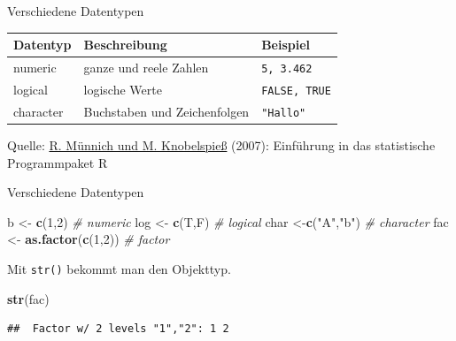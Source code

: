 \documentclass[ignorenonframetext,]{beamer}
\newenvironment{Shaded}{}{}
\newcommand{\KeywordTok}[1]{\textcolor[rgb]{0.00,0.44,0.13}{\textbf{{#1}}}}
\newcommand{\DecValTok}[1]{\textcolor[rgb]{0.25,0.63,0.44}{{#1}}}
\newcommand{\StringTok}[1]{\textcolor[rgb]{0.25,0.44,0.63}{{#1}}}
\newcommand{\CommentTok}[1]{\textcolor[rgb]{0.38,0.63,0.69}{\textit{{#1}}}}
\newcommand{\NormalTok}[1]{{#1}}
\begin{document}
\begin{frame}[fragile]{Verschiedene Datentypen}

\begin{longtable}[]{@{}lll@{}}
\toprule
Datentyp & Beschreibung & Beispiel\tabularnewline
\midrule
\endhead
numeric & ganze und reele Zahlen & \texttt{5,\ 3.462}\tabularnewline
logical & logische Werte & \texttt{FALSE,\ TRUE}\tabularnewline
character & Buchstaben und Zeichenfolgen &
\texttt{"Hallo"}\tabularnewline
\bottomrule
\end{longtable}

Quelle:
\href{https://www.uni-trier.de/fileadmin/fb4/prof/VWL/FIN/Oekonometrie/PC-UEbung/Einfuehrung_in_R.pdf}{R.
Münnich und M. Knobelspieß} (2007): Einführung in das statistische
Programmpaket R

\end{frame}

\begin{frame}[fragile]{Verschiedene Datentypen}

\begin{Shaded}
\begin{Highlighting}[]
\NormalTok{b <-}\StringTok{ }\KeywordTok{c}\NormalTok{(}\DecValTok{1}\NormalTok{,}\DecValTok{2}\NormalTok{) }\CommentTok{# numeric}
\NormalTok{log <-}\StringTok{ }\KeywordTok{c}\NormalTok{(T,F) }\CommentTok{# logical}
\NormalTok{char <-}\KeywordTok{c}\NormalTok{(}\StringTok{"A"}\NormalTok{,}\StringTok{"b"}\NormalTok{) }\CommentTok{# character}
\NormalTok{fac <-}\StringTok{ }\KeywordTok{as.factor}\NormalTok{(}\KeywordTok{c}\NormalTok{(}\DecValTok{1}\NormalTok{,}\DecValTok{2}\NormalTok{)) }\CommentTok{# factor}
\end{Highlighting}
\end{Shaded}

Mit \texttt{str()} bekommt man den Objekttyp.

\begin{Shaded}
\begin{Highlighting}[]
\KeywordTok{str}\NormalTok{(fac)}
\end{Highlighting}
\end{Shaded}

\begin{verbatim}
##  Factor w/ 2 levels "1","2": 1 2
\end{verbatim}

\end{frame}
\end{document}
